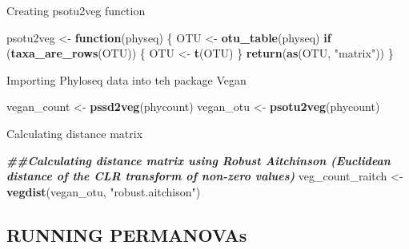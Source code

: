 \documentclass[
]{article}
\newenvironment{Shaded}{\begin{snugshade}}{\end{snugshade}}
\newcommand{\ControlFlowTok}[1]{\textcolor[rgb]{0.13,0.29,0.53}{\textbf{#1}}}
\newcommand{\DocumentationTok}[1]{\textcolor[rgb]{0.56,0.35,0.01}{\textbf{\textit{#1}}}}
\newcommand{\FunctionTok}[1]{\textcolor[rgb]{0.13,0.29,0.53}{\textbf{#1}}}
\newcommand{\NormalTok}[1]{#1}
\newcommand{\OtherTok}[1]{\textcolor[rgb]{0.56,0.35,0.01}{#1}}
\newcommand{\StringTok}[1]{\textcolor[rgb]{0.31,0.60,0.02}{#1}}
\begin{document}
Creating psotu2veg function

\begin{Shaded}
\begin{Highlighting}[]
\NormalTok{psotu2veg }\OtherTok{\textless{}{-}} \ControlFlowTok{function}\NormalTok{(physeq) \{}
\NormalTok{  OTU }\OtherTok{\textless{}{-}} \FunctionTok{otu\_table}\NormalTok{(physeq)}
  \ControlFlowTok{if}\NormalTok{ (}\FunctionTok{taxa\_are\_rows}\NormalTok{(OTU)) \{}
\NormalTok{    OTU }\OtherTok{\textless{}{-}} \FunctionTok{t}\NormalTok{(OTU)}
\NormalTok{  \}}
  \FunctionTok{return}\NormalTok{(}\FunctionTok{as}\NormalTok{(OTU, }\StringTok{"matrix"}\NormalTok{))}
\NormalTok{\}}
\end{Highlighting}
\end{Shaded}

Importing Phyloseq data into teh package Vegan

\begin{Shaded}
\begin{Highlighting}[]
\NormalTok{vegan\_count }\OtherTok{\textless{}{-}} \FunctionTok{pssd2veg}\NormalTok{(phycount)}
\NormalTok{vegan\_otu }\OtherTok{\textless{}{-}} \FunctionTok{psotu2veg}\NormalTok{(phycount)}
\end{Highlighting}
\end{Shaded}

Calculating distance matrix

\begin{Shaded}
\begin{Highlighting}[]
\DocumentationTok{\#\#Calculating distance matrix using Robust Aitchinson (Euclidean distance of the CLR transform of non{-}zero values)}
\NormalTok{veg\_count\_raitch }\OtherTok{\textless{}{-}} \FunctionTok{vegdist}\NormalTok{(vegan\_otu, }\StringTok{"robust.aitchison"}\NormalTok{)}
\end{Highlighting}
\end{Shaded}

\subsection{RUNNING PERMANOVAs}\label{running-permanovas}
\end{document}
